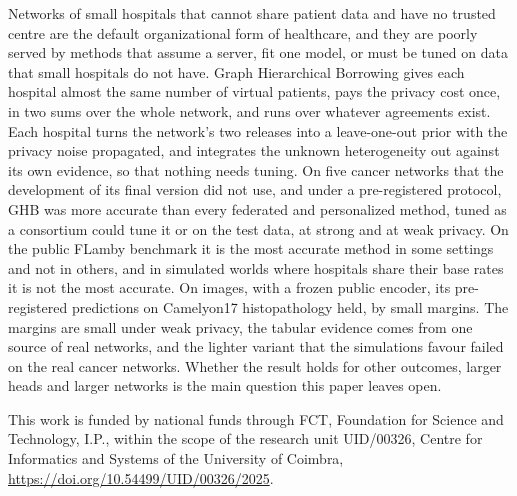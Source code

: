\documentclass[acmsmall,screen,review]{acmart}
\theoremstyle{acmdefinition}
\begin{document}
Networks of small hospitals that cannot share patient data and have no trusted centre are the default organizational form of healthcare, and they are poorly served by methods that assume a server, fit one model, or must be tuned on data that small hospitals do not have. Graph Hierarchical Borrowing gives each hospital almost the same number of virtual patients, pays the privacy cost once, in two sums over the whole network, and runs over whatever agreements exist. Each hospital turns the network's two releases into a leave-one-out prior with the privacy noise propagated, and integrates the unknown heterogeneity out against its own evidence, so that nothing needs tuning. On five cancer networks that the development of its final version did not use, and under a pre-registered protocol, GHB was more accurate than every federated and personalized method, tuned as a consortium could tune it or on the test data, at strong and at weak privacy. On the public FLamby benchmark \cite{ogierduterrail2022flamby} it is the most accurate method in some settings and not in others, and in simulated worlds where hospitals share their base rates it is not the most accurate. On images, with a frozen public encoder, its pre-registered predictions on Camelyon17 histopathology held, by small margins. The margins are small under weak privacy, the tabular evidence comes from one source of real networks, and the lighter variant that the simulations favour failed on the real cancer networks. Whether the result holds for other outcomes, larger heads and larger networks is the main question this paper leaves open.

\begin{acks}
This work is funded by national funds through FCT, Foundation for Science and Technology, I.P., within the scope of the research unit UID/00326, Centre for Informatics and Systems of the University of Coimbra, \url{https://doi.org/10.54499/UID/00326/2025}.
\end{acks}



\end{document}
